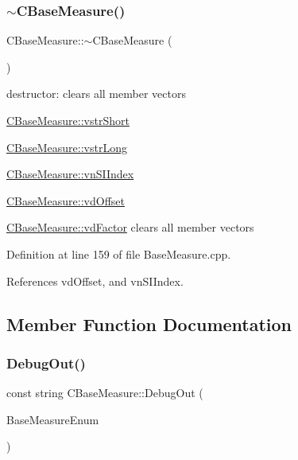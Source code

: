 \subsubsection{\texorpdfstring{$\sim$\+C\+Base\+Measure()}{~CBaseMeasure()}}
{\footnotesize\ttfamily C\+Base\+Measure\+::$\sim$\+C\+Base\+Measure (\begin{DoxyParamCaption}{ }\end{DoxyParamCaption})}



destructor\+: clears all member vectors 


\begin{DoxyItemize}
\item \hyperlink{classCVectorHandle_afb50c8a33d4cf70bf92c644dca409ea2}{C\+Base\+Measure\+::vstr\+Short}
\item \hyperlink{classCVectorHandle_a71bec0e385b9ca8e5ffa174b559da9f8}{C\+Base\+Measure\+::vstr\+Long}
\item \hyperlink{classCBaseMeasure_aaaddf8a6ce321b282885953439472390}{C\+Base\+Measure\+::vn\+S\+I\+Index}
\item \hyperlink{classCBaseMeasure_a7220e3dfd4fbdd319a5c3c6af844259e}{C\+Base\+Measure\+::vd\+Offset}
\item \hyperlink{classCVectorHandle_af8f8b2e0da8363e695872ca85f33364e}{C\+Base\+Measure\+::vd\+Factor} clears all member vectors 
\end{DoxyItemize}

Definition at line 159 of file Base\+Measure.\+cpp.



References vd\+Offset, and vn\+S\+I\+Index.



\subsection{Member Function Documentation}
\mbox{\label{classCBaseMeasure_acb998b7f15d9aa3530b2cb0b910177fd}} 
\subsubsection{\texorpdfstring{Debug\+Out()}{DebugOut()}}
{\footnotesize\ttfamily const string C\+Base\+Measure\+::\+Debug\+Out (\begin{DoxyParamCaption}\item[{const \hyperlink{BaseMeasure_8h_ac90e5164ccf1f0d648fba7e94b229a11}{e\+Base\+Measure}}]{Base\+Measure\+Enum }\end{DoxyParamCaption})}



